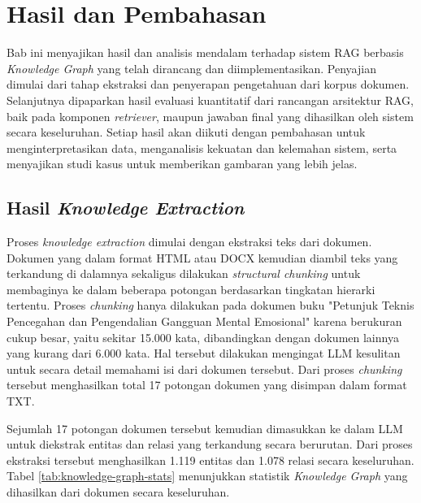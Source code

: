 \chapter{Hasil dan Pembahasan}

Bab ini menyajikan hasil dan analisis mendalam terhadap sistem RAG berbasis \textit{Knowledge Graph} yang telah dirancang dan diimplementasikan.
Penyajian dimulai dari tahap ekstraksi dan penyerapan pengetahuan dari korpus dokumen.
Selanjutnya dipaparkan hasil evaluasi kuantitatif dari rancangan arsitektur RAG, baik pada komponen \textit{retriever}, maupun jawaban final yang dihasilkan oleh sistem secara keseluruhan.
Setiap hasil akan diikuti dengan pembahasan untuk menginterpretasikan data, menganalisis kekuatan dan kelemahan sistem, serta menyajikan studi kasus untuk memberikan gambaran yang lebih jelas.

\section{Hasil \textit{Knowledge Extraction}}
Proses \textit{knowledge extraction} dimulai dengan ekstraksi teks dari dokumen.
Dokumen yang dalam format HTML atau DOCX kemudian diambil teks yang terkandung di dalamnya sekaligus dilakukan \textit{structural chunking} untuk membaginya ke dalam beberapa potongan berdasarkan tingkatan hierarki tertentu.
Proses \textit{chunking} hanya dilakukan pada dokumen buku "Petunjuk Teknis Pencegahan dan Pengendalian Gangguan Mental Emosional" karena berukuran cukup besar, yaitu sekitar 15.000 kata, dibandingkan dengan dokumen lainnya yang kurang dari 6.000 kata.
Hal tersebut dilakukan mengingat LLM kesulitan untuk secara detail memahami isi dari dokumen tersebut.
Dari proses \textit{chunking} tersebut menghasilkan total 17 potongan dokumen yang disimpan dalam format TXT.

Sejumlah 17 potongan dokumen tersebut kemudian dimasukkan ke dalam LLM untuk diekstrak entitas dan relasi yang terkandung secara berurutan.
Dari proses ekstraksi tersebut menghasilkan 1.119 entitas dan 1.078 relasi secara keseluruhan.
Tabel \ref{tab:knowledge-graph-stats} menunjukkan statistik \textit{Knowledge Graph} yang dihasilkan dari dokumen secara keseluruhan.

